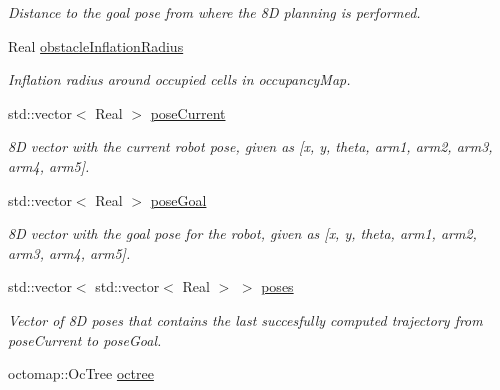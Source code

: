 \begin{DoxyCompactItemize}
\begin{DoxyCompactList}\small\item\em Distance to the goal pose from where the 8\-D planning is performed. \end{DoxyCompactList}\item 
\hypertarget{classSquirrelMotionPlanner_1_1Planner_af237d3ea9fa294b8a36f69a450a2f54f}{Real \hyperlink{classSquirrelMotionPlanner_1_1Planner_af237d3ea9fa294b8a36f69a450a2f54f}{obstacle\-Inflation\-Radius}}\label{classSquirrelMotionPlanner_1_1Planner_af237d3ea9fa294b8a36f69a450a2f54f}

\begin{DoxyCompactList}\small\item\em Inflation radius around occupied cells in occupancy\-Map. \end{DoxyCompactList}\item 
\hypertarget{classSquirrelMotionPlanner_1_1Planner_aa5a0935070f588666ab8bc593fcfefd7}{std\-::vector$<$ Real $>$ \hyperlink{classSquirrelMotionPlanner_1_1Planner_aa5a0935070f588666ab8bc593fcfefd7}{pose\-Current}}\label{classSquirrelMotionPlanner_1_1Planner_aa5a0935070f588666ab8bc593fcfefd7}

\begin{DoxyCompactList}\small\item\em 8\-D vector with the current robot pose, given as \mbox{[}x, y, theta, arm1, arm2, arm3, arm4, arm5\mbox{]}. \end{DoxyCompactList}\item 
\hypertarget{classSquirrelMotionPlanner_1_1Planner_a5c75ba9728d5f36e82f64cb3b55c5a61}{std\-::vector$<$ Real $>$ \hyperlink{classSquirrelMotionPlanner_1_1Planner_a5c75ba9728d5f36e82f64cb3b55c5a61}{pose\-Goal}}\label{classSquirrelMotionPlanner_1_1Planner_a5c75ba9728d5f36e82f64cb3b55c5a61}

\begin{DoxyCompactList}\small\item\em 8\-D vector with the goal pose for the robot, given as \mbox{[}x, y, theta, arm1, arm2, arm3, arm4, arm5\mbox{]}. \end{DoxyCompactList}\item 
\hypertarget{classSquirrelMotionPlanner_1_1Planner_a2b73c0833137af6903850a38257a1bb5}{std\-::vector$<$ std\-::vector$<$ Real $>$ $>$ \hyperlink{classSquirrelMotionPlanner_1_1Planner_a2b73c0833137af6903850a38257a1bb5}{poses}}\label{classSquirrelMotionPlanner_1_1Planner_a2b73c0833137af6903850a38257a1bb5}

\begin{DoxyCompactList}\small\item\em Vector of 8\-D poses that contains the last succesfully computed trajectory from pose\-Current to pose\-Goal. \end{DoxyCompactList}\item 
\hypertarget{classSquirrelMotionPlanner_1_1Planner_a04067c4cc6fade0c2f8f1de98a44053f}{octomap\-::\-Oc\-Tree \hyperlink{classSquirrelMotionPlanner_1_1Planner_a04067c4cc6fade0c2f8f1de98a44053f}{octree}}\label{classSquirrelMotionPlanner_1_1Planner_a04067c4cc6fade0c2f8f1de98a44053f}


\end{DoxyCompactItemize}

